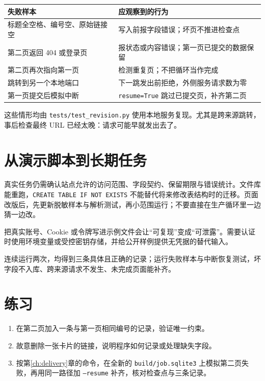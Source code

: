 \begin{center}\small
\begin{tabularx}{\textwidth}{@{}p{}X@{}}
\toprule
失败样本 & 应观察到的行为\\\midrule
标题全空格、编号空、原始链接空 & 写入前报字段错误；坏页不推进检查点\\
第二页返回 404 或登录页 & 报状态或内容错误；第一页已提交的数据保留\\
第二页再次指向第一页 & 检测重复页；不把循环当作完成\\
跳转到另一个本地端口 & 下一跳发出前拒绝，外侧服务请求数为零\\
第一页提交后模拟中断 & \texttt{resume=True} 跳过已提交页，补齐第二页\\
\bottomrule
\end{tabularx}
\end{center}
这些情形均由 \texttt{tests/test\_revision.py} 使用本地服务复现。尤其是跨来源跳转，事后检查最终 URL 已经太晚：请求可能早就发出去了。

\section{从演示脚本到长期任务}
真实任务仍需确认站点允许的访问范围、字段契约、保留期限与错误统计。文件库能重跑，\texttt{CREATE TABLE IF NOT EXISTS} 不能替代将来修改表结构时的迁移。页面改版后，先更新脱敏样本与解析测试，再小范围运行；不要直接在生产循环里一边猜一边改。

\begin{warning}
把真实账号、Cookie 或令牌写进示例文件会让“可复现”变成“可泄露”。需要认证时使用环境变量或受控密钥存储，并给公开样例提供无凭据的替代输入。
\end{warning}

\begin{tcolorbox}[title=本章验收,colframe=Teal,colback=Teal!3]
连续运行两次，均得到三条具体且正确的记录；运行失败样本与中断恢复测试，坏字段不入库、跨来源请求不发生、未完成页面能补齐。
\end{tcolorbox}

\section{练习}
\begin{enumerate}[label=\arabic*.]
\item 在第二页加入一条与第一页相同编号的记录，验证唯一约束。
\item 故意删除一张卡片的链接，说明程序如何记录或处理缺失字段。
\item 按第\ref{ch:delivery}章的命令，在全新的 \texttt{build/job.sqlite3} 上模拟第二页失败，再用同一路径加 \texttt{--resume} 补齐，核对检查点与三条记录。
\end{enumerate}

